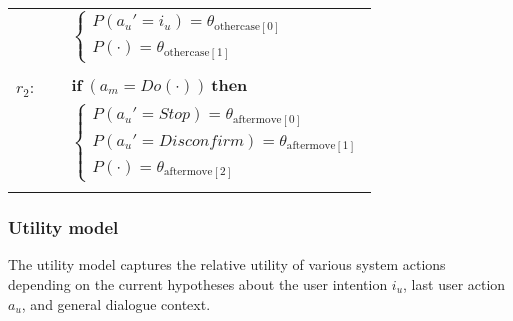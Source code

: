 \begin{footnotesize}
\begin{longtable}{p{2cm}l}
& \;\;\;\;\; $ \begin{cases}P(\mathit{a_u}'\!=\!\mathit{{i_u}})\!=\!\theta_{\mathrm{othercase[0]}} \\
P(\cdot)\!=\!\theta_{\mathrm{othercase[1]}} \end{cases}$ \\ \\[-1mm]
$r_{2}$: \ \ & $ \textbf{if} \ (\mathit{a_m}\!=\!\mathit{Do(\cdot)}) \ \textbf{then} $ \\
 & \;\;\;\;\; $ \begin{cases}P(\mathit{a_u}'\!=\!\mathit{Stop})\!=\!\theta_{\mathrm{aftermove[0]}} \\
P(\mathit{a_u}'\!=\!\mathit{Disconfirm})\!=\!\theta_{\mathrm{aftermove[1]}} \\
P(\cdot)\!=\!\theta_{\mathrm{aftermove[2]}} \end{cases}$ \\ \\[-1mm]
\end{longtable}
\end{footnotesize}


\subsubsection*{Utility model}

The utility model captures the relative utility of various system actions depending on the current hypotheses about the user intention $i_u$, last user action $a_u$, and general dialogue context. 

